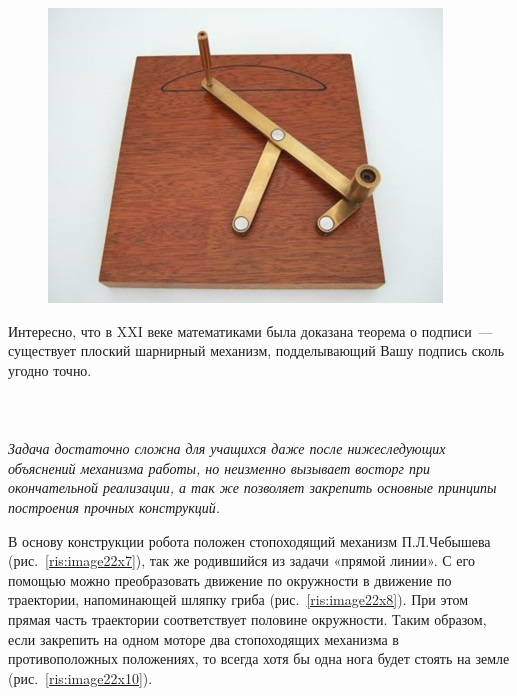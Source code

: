 \begin{figure}[h!]
	\begin{center}
		\includegraphics[width=0.99\linewidth]{chapters/chapter22/images/9}
		\caption{}
		\label{ris:image22x9}
	\end{center}
\end{figure}

Интересно, что в XXI веке математиками была доказана теорема о подписи~--- существует плоский шарнирный механизм, подделывающий Вашу подпись сколь угодно точно.\\\\

{\hypertarget{lesson22x3}{}}\\\\

{\slshape Задача достаточно сложна для учащихся даже после нижеследующих объяснений механизма работы, но неизменно вызывает восторг при окончательной реализации, а так же позволяет закрепить основные принципы построения прочных конструкций.}

В основу конструкции робота положен стопоходящий механизм П.Л.Чебышева (рис.~\ref{ris:image22x7}), так же родившийся из задачи «прямой линии». С его помощью можно преобразовать движение по окружности в движение по траектории, напоминающей шляпку гриба (рис.~\ref{ris:image22x8}). При этом прямая часть траектории соответствует половине окружности. Таким образом, если закрепить на одном моторе два стопоходящих механизма в противоположных положениях, то всегда хотя бы одна нога будет стоять на земле (рис.~\ref{ris:image22x10}). 

